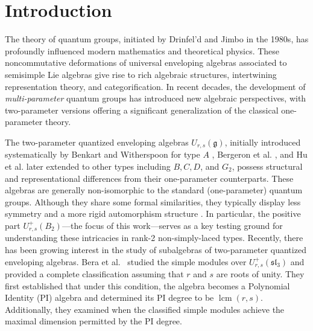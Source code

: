 \documentclass[12 pt,reqno]{amsart}
\numberwithin{equation}{section}
\theoremstyle{definition}
\theoremstyle{definition}
\theoremstyle{remark}
\theoremstyle{remark}
\begin{document}
\section{Introduction}

The theory of quantum groups, initiated by Drinfel’d and Jimbo in the 1980s, has profoundly influenced modern mathematics and theoretical physics. These noncommutative deformations of universal enveloping algebras associated to semisimple Lie algebras give rise to rich algebraic structures, intertwining representation theory, and categorification. In recent decades, the development of \emph{multi-parameter} quantum groups has introduced new algebraic perspectives, with two-parameter versions offering a significant generalization of the classical one-parameter theory.
\par The two-parameter quantized enveloping algebras $ U_{r,s}(\mathfrak{g}) $, initially introduced systematically by Benkart and Witherspoon for type $ A $ \cite{sb2,sb1},  Bergeron et al. \cite{ber}, and Hu et al. \cite{hu1,hu4,hu,hu3,hu2} later extended to other types including $B, C, D$, and $ G_2 $, possess structural and representational differences from their one-parameter counterparts. These algebras are generally non-isomorphic to the standard (one-parameter) quantum groups. Although they share some formal similarities, they typically display less symmetry and a more rigid automorphism structure \cite{Tang1}. In particular, the positive part $ U^+_{r,s}(B_2) $---the focus of this work---serves as a key testing ground for understanding these intricacies in rank-2 non-simply-laced types. Recently, there has been growing interest in the study of subalgebras of two-parameter quantized enveloping algebras. Bera et al.~\cite{sb} studied the simple modules over $U_{r,s}^+(\mathfrak{sl}_3)$ and provided a complete classification assuming that $r$ and $s$ are roots of unity. They first established that under this condition, the algebra becomes a Polynomial Identity (PI) algebra and determined its PI degree to be $\operatorname{lcm}(r,s)$. Additionally, they examined when the classified simple modules achieve the maximal dimension permitted by the PI degree.
\end{document}

